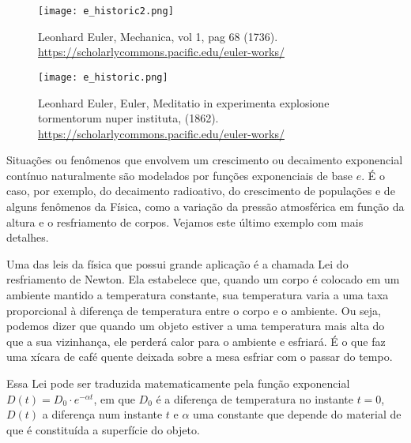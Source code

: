 \begin{knowledge} {}
\begin{figure}[H]
	\centering
	\texttt{[image: e\_historic2.png]}
	\caption{Leonhard Euler, Mechanica, vol 1, pag 68 (1736). \url{https://scholarlycommons.pacific.edu/euler-works/}}
\end{figure}

\begin{figure}[H]
	\centering
	\texttt{[image: e\_historic.png]}
	\caption{Leonhard Euler, Euler, Meditatio in experimenta explosione tormentorum nuper instituta, (1862). \url{https://scholarlycommons.pacific.edu/euler-works/}}
\end{figure}

Situações ou fenômenos que envolvem um crescimento ou decaimento exponencial contínuo naturalmente são modelados por funções exponenciais de base $e$. É o caso, por exemplo, do decaimento radioativo, do crescimento de populações e de alguns fenômenos da Física, como a variação da pressão atmosférica em função da altura e o resfriamento de corpos. Vejamos este último exemplo com mais detalhes.

Uma das leis da física que possui grande aplicação é a chamada Lei do resfriamento de Newton. Ela estabelece que, quando um corpo é colocado em um ambiente mantido a temperatura constante, sua temperatura varia a uma taxa proporcional à diferença de temperatura entre o corpo e o ambiente. Ou seja, podemos dizer que quando um objeto estiver a uma temperatura mais alta do que a sua vizinhança, ele perderá calor para o ambiente e esfriará. É o que faz uma xícara de café quente deixada sobre a mesa esfriar com o passar do tempo.

Essa Lei pode ser traduzida matematicamente pela função exponencial $D(t)=D_{0} \cdot e^{-\alpha t}$, em que $D_{0}$ é a diferença de temperatura no instante $t=0$, $D(t)$ a diferença num instante $t$ e $\alpha$  uma constante que depende do material de que é constituída a superfície do objeto.
	
\end{knowledge}
\newpage

